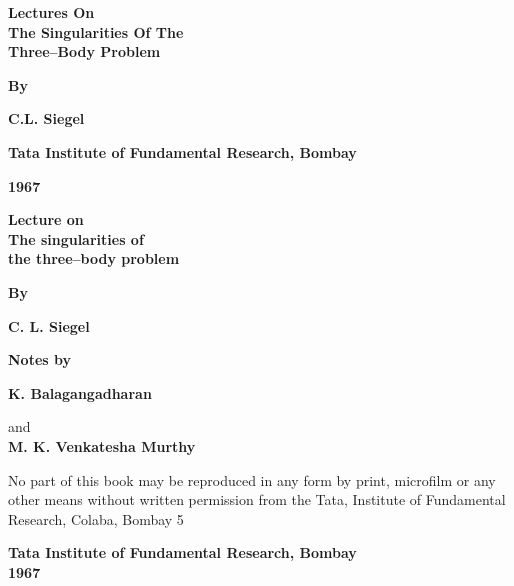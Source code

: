 \thispagestyle{empty}

\begin{center}
{\Large\bf Lectures On}\\[5pt]
{\Large\bf The Singularities Of The}\\[5pt]
{\Large\bf Three--Body Problem}\\
\vfill

{\bf By}
\medskip

{\large\bf C.L. Siegel}
\vfill

{\bf Tata Institute of Fundamental Research, Bombay}

{\bf 1967}
\end{center}

\eject

\thispagestyle{empty}

\begin{center}
{\Large\bf Lecture on}\\[5pt]
{\Large\bf The singularities of}\\[5pt] 
{\Large\bf the three--body problem}\\
\vfill

{\bf By}
\bigskip

{\large\bf C. L. Siegel}
\vfill

{\bf Notes by}
\bigskip

{\large\bf K. Balagangadharan}
\medskip

and\\

\medskip
{\large\bf M. K. Venkatesha Murthy}
\vfill

\parbox{0.7\textwidth}{No part of this book may be reproduced
in any form  by print, microfilm or any
other means without written permission
from the Tata, Institute of Fundamental
Research, Colaba, Bombay 5}
\vfill

{\bf Tata Institute of Fundamental  Research, Bombay}\\


{\bf 1967}
\end{center}

